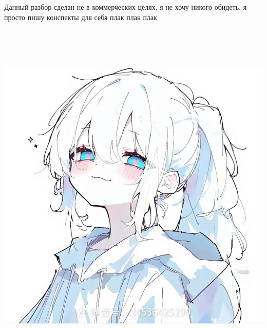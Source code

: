 \documentclass{article}
\begin{document}
Данный разбор сделан не в коммерческих целях, я не хочу никого обидеть, я просто пишу конспекты для себя плак плак плак
\begin{center}
   \includegraphics[height=17cm]{assets/cute-girl.jpg}
\end{center}
\end{document}
